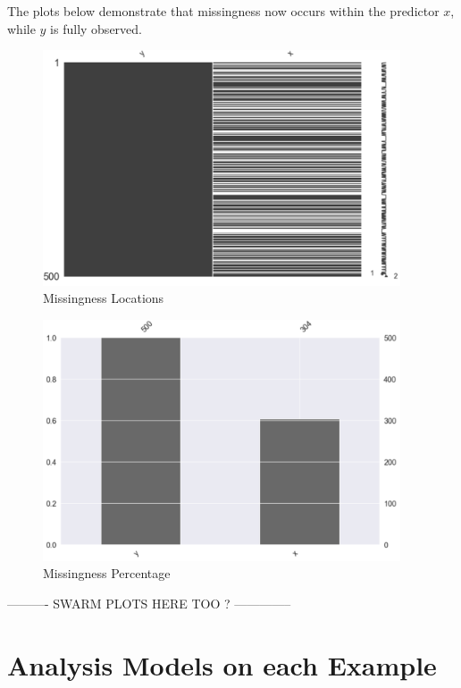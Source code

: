 \documentclass[12pt,oneside]{chicagocapstone}
\begin{document}
The plots below demonstrate that missingness now occurs within the
predictor \(x\), while \(y\) is fully observed.
\begin{figure}

{\centering \includegraphics[width=400px]{figure/x-mis-forty-loc-mar} 

}

\caption{Missingness Locations}\label{fig:x-mis-forty-loc-mar}
\end{figure}
\begin{figure}

{\centering \includegraphics[width=400px]{figure/x-mis-forty-bar-mar} 

}

\caption{Missingness Percentage}\label{fig:x-mis-forty-bar-mar}
\end{figure}
---------- SWARM PLOTS HERE TOO ? --------------

\section*{Analysis Models on each
Example}\label{analysis-models-on-each-example}
\end{document}
